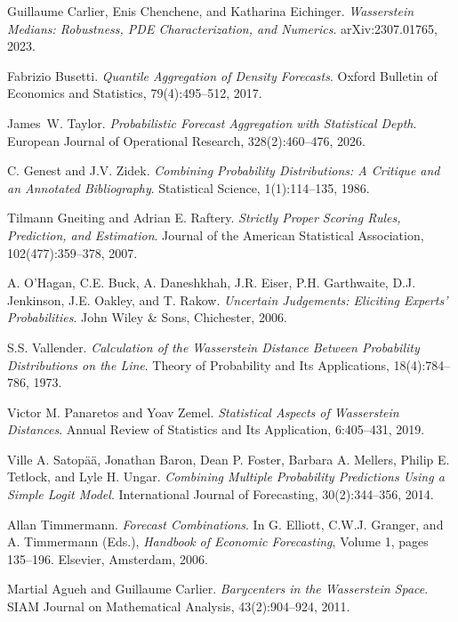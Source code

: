 Guillaume Carlier, Enis Chenchene, and Katharina Eichinger.
\textit{Wasserstein Medians: Robustness, {PDE} Characterization, and Numerics}.
arXiv:2307.01765, 2023.

Fabrizio Busetti.
\textit{Quantile Aggregation of Density Forecasts}.
Oxford Bulletin of Economics and Statistics, 79(4):495--512, 2017.

James~W. Taylor.
\textit{Probabilistic Forecast Aggregation with Statistical Depth}.
European Journal of Operational Research, 328(2):460--476, 2026.

C. Genest and J.V. Zidek.
\textit{Combining Probability Distributions: A Critique and an Annotated Bibliography}.
Statistical Science, 1(1):114--135, 1986.

Tilmann Gneiting and Adrian E. Raftery.
\textit{Strictly Proper Scoring Rules, Prediction, and Estimation}.
Journal of the American Statistical Association, 102(477):359--378, 2007.

A. O'Hagan, C.E. Buck, A. Daneshkhah, J.R. Eiser, P.H. Garthwaite,
D.J. Jenkinson, J.E. Oakley, and T. Rakow.
\textit{Uncertain Judgements: Eliciting Experts' Probabilities}.
John Wiley \& Sons, Chichester, 2006.

S.S. Vallender.
\textit{Calculation of the Wasserstein Distance Between Probability Distributions on the Line}.
Theory of Probability and Its Applications, 18(4):784--786, 1973.

Victor M. Panaretos and Yoav Zemel.
\textit{Statistical Aspects of Wasserstein Distances}.
Annual Review of Statistics and Its Application, 6:405--431, 2019.

Ville A. Satop{\"a}{\"a}, Jonathan Baron, Dean P. Foster, Barbara A. Mellers,
Philip E. Tetlock, and Lyle H. Ungar.
\textit{Combining Multiple Probability Predictions Using a Simple Logit Model}.
International Journal of Forecasting, 30(2):344--356, 2014.

Allan Timmermann.
\textit{Forecast Combinations}.
In G. Elliott, C.W.J. Granger, and A. Timmermann (Eds.),
\textit{Handbook of Economic Forecasting}, Volume 1, pages 135--196.
Elsevier, Amsterdam, 2006.

Martial Agueh and Guillaume Carlier.
\textit{Barycenters in the Wasserstein Space}.
SIAM Journal on Mathematical Analysis, 43(2):904--924, 2011.

